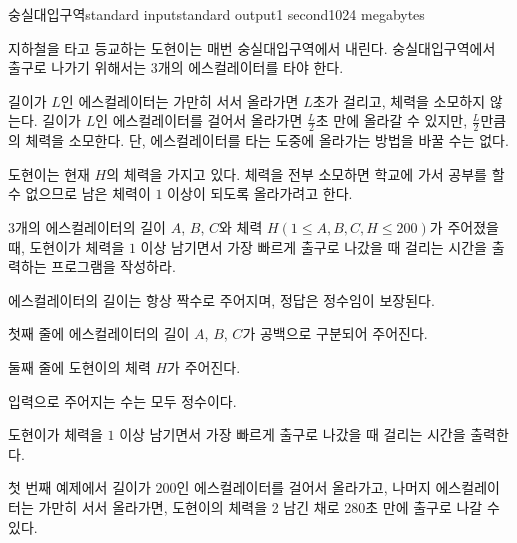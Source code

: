 \begin{problem}{숭실대입구역}{standard input}{standard output}{1 second}{1024 megabytes}

지하철을 타고 등교하는 도현이는 매번 숭실대입구역에서 내린다. 숭실대입구역에서 출구로 나가기 위해서는 3개의 에스컬레이터를 타야 한다.

길이가 $L$인 에스컬레이터는 가만히 서서 올라가면 $L$초가 걸리고, 체력을 소모하지 않는다. 길이가 $L$인 에스컬레이터를 걸어서 올라가면 $\frac{L}{2}$초 만에 올라갈 수 있지만, $\frac{L}{2}$만큼의 체력을 소모한다. 단, 에스컬레이터를 타는 도중에 올라가는 방법을 바꿀 수는 없다.

도현이는 현재 $H$의 체력을 가지고 있다. 체력을 전부 소모하면 학교에 가서 공부를 할 수 없으므로 남은 체력이 $1$ 이상이 되도록 올라가려고 한다.

3개의 에스컬레이터의 길이 $A$, $B$, $C$와 체력 $H$$(1 \le A, B, C, H \le 200)$가 주어졌을 때, 도현이가 체력을 $1$ 이상 남기면서 가장 빠르게 출구로 나갔을 때 걸리는 시간을 출력하는 프로그램을 작성하라.

에스컬레이터의 길이는 항상 짝수로 주어지며, 정답은 정수임이 보장된다.

\InputFile
첫째 줄에 에스컬레이터의 길이 $A$, $B$, $C$가 공백으로 구분되어 주어진다.

둘째 줄에 도현이의 체력 $H$가 주어진다.

입력으로 주어지는 수는 모두 정수이다.

\OutputFile
도현이가 체력을 $1$ 이상 남기면서 가장 빠르게 출구로 나갔을 때 걸리는 시간을 출력한다.

\Examples

\begin{example}
%
%
\end{example}

\Note
첫 번째 예제에서 길이가 $200$인 에스컬레이터를 걸어서 올라가고, 나머지 에스컬레이터는 가만히 서서 올라가면, 도현이의 체력을 2 남긴 채로 280초 만에 출구로 나갈 수 있다.

\end{problem}


